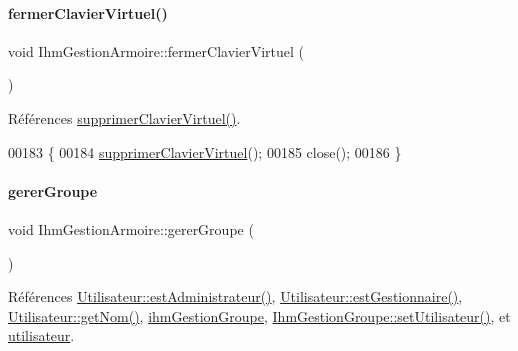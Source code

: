 \paragraph{\texorpdfstring{fermer\+Clavier\+Virtuel()}{fermerClavierVirtuel()}}
{\footnotesize\ttfamily void Ihm\+Gestion\+Armoire\+::fermer\+Clavier\+Virtuel (\begin{DoxyParamCaption}{ }\end{DoxyParamCaption})\hspace{0.3cm}{\ttfamily [private]}}



Références \hyperlink{class_ihm_gestion_armoire_ac82ab8c9ad48f26ab928b7a72e4dcee0}{supprimer\+Clavier\+Virtuel()}.


\begin{DoxyCode}
00183 \{
00184     \hyperlink{class_ihm_gestion_armoire_ac82ab8c9ad48f26ab928b7a72e4dcee0}{supprimerClavierVirtuel}();
00185     close();
00186 \}
\end{DoxyCode}
\mbox{\label{class_ihm_gestion_armoire_a4cd664c766e29593d3fedf2baea6a330}} 
\paragraph{\texorpdfstring{gerer\+Groupe}{gererGroupe}}
{\footnotesize\ttfamily void Ihm\+Gestion\+Armoire\+::gerer\+Groupe (\begin{DoxyParamCaption}{ }\end{DoxyParamCaption})\hspace{0.3cm}{\ttfamily [slot]}}



Références \hyperlink{class_utilisateur_a2c4ede0ec936ebd64d73df1e1dde3a5d}{Utilisateur\+::est\+Administrateur()}, \hyperlink{class_utilisateur_a3c86ddd77b243fd3f12ad2e85ff06759}{Utilisateur\+::est\+Gestionnaire()}, \hyperlink{class_utilisateur_adfffec2519ba338497de55b61e7bc420}{Utilisateur\+::get\+Nom()}, \hyperlink{class_ihm_gestion_armoire_af590a9a2a114e7ee791db540f87c01ef}{ihm\+Gestion\+Groupe}, \hyperlink{class_ihm_gestion_groupe_a88bbe8b5652781d4a80a50ed6bf9d329}{Ihm\+Gestion\+Groupe\+::set\+Utilisateur()}, et \hyperlink{class_ihm_gestion_armoire_aa14adf3863cf09947411fc33e413076c}{utilisateur}.



